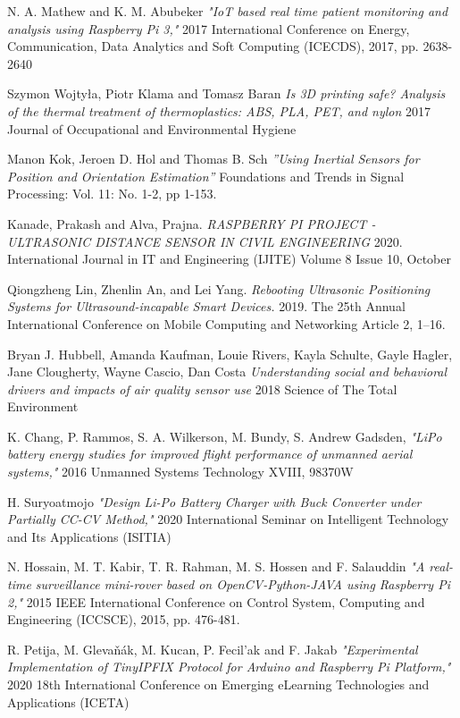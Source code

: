 \documentclass[conference,a4paper]{IEEEtran}
\begin{document}
\begin{thebibliography}{}
N. A. Mathew and K. M. Abubeker
\textit{"IoT based real time patient monitoring and analysis using Raspberry Pi 3,"} 
2017 International Conference on Energy, Communication, Data Analytics and Soft Computing (ICECDS), 2017, pp. 2638-2640

Szymon Wojtyła, Piotr Klama and Tomasz Baran 
\textit{Is 3D printing safe? Analysis of the thermal treatment of thermoplastics: ABS, PLA, PET, and nylon} 2017 Journal of Occupational and Environmental Hygiene

Manon Kok, Jeroen D. Hol and Thomas B. Sch 
\textit{”Using Inertial Sensors for Position and Orientation Estimation”} Foundations and Trends in Signal Processing: Vol. 11: No. 1-2, pp 1-153. 

Kanade, Prakash and Alva, Prajna.
\textit{RASPBERRY PI PROJECT -ULTRASONIC DISTANCE SENSOR IN CIVIL ENGINEERING} 
2020. International Journal in IT and Engineering (IJITE) Volume 8 Issue 10, October

Qiongzheng Lin, Zhenlin An, and Lei Yang. 
\textit{Rebooting Ultrasonic Positioning Systems for Ultrasound-incapable Smart Devices.} 
2019. The 25th Annual International Conference on Mobile Computing and Networking Article 2, 1–16.

Bryan J. Hubbell, Amanda Kaufman, Louie Rivers, Kayla Schulte, Gayle Hagler, Jane Clougherty, Wayne Cascio, Dan Costa
\textit{Understanding social and behavioral drivers and impacts of air quality sensor use}
2018 Science of The Total Environment

K. Chang, P. Rammos, S. A. Wilkerson, M. Bundy, S. Andrew Gadsden, 
\textit{"LiPo battery energy studies for improved flight performance of unmanned aerial systems,"} 
2016 Unmanned Systems Technology XVIII, 98370W

H. Suryoatmojo
\textit{"Design Li-Po Battery Charger with Buck Converter under Partially CC-CV Method,"}
2020 International Seminar on Intelligent Technology and Its Applications (ISITIA)

N. Hossain, M. T. Kabir, T. R. Rahman, M. S. Hossen and F. Salauddin
\textit{"A real-time surveillance mini-rover based on OpenCV-Python-JAVA using Raspberry Pi 2,"} 
2015 IEEE International Conference on Control System, Computing and Engineering (ICCSCE), 2015, pp. 476-481.

R. Petija, M. Glevaňák, M. Kucan, P. Fecil'ak and F. Jakab
\textit{"Experimental Implementation of TinyIPFIX Protocol for Arduino and Raspberry Pi Platform,"} 
2020 18th International Conference on Emerging eLearning Technologies and Applications (ICETA)


\end{thebibliography}
\end{document}
